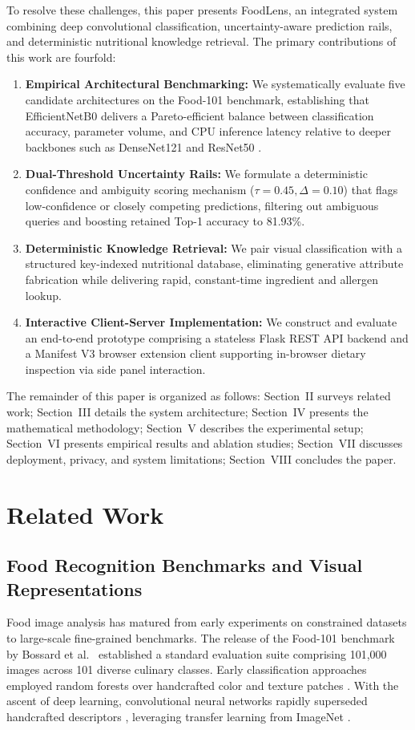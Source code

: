 \documentclass[conference]{IEEEtran}
\begin{document}
To resolve these challenges, this paper presents FoodLens, an integrated system combining deep convolutional classification, uncertainty-aware prediction rails, and deterministic nutritional knowledge retrieval. The primary contributions of this work are fourfold:
\begin{enumerate}
    \item \textbf{Empirical Architectural Benchmarking:} We systematically evaluate five candidate architectures on the Food-101 benchmark, establishing that EfficientNetB0 \cite{tan2019efficientnet} delivers a Pareto-efficient balance between classification accuracy, parameter volume, and CPU inference latency relative to deeper backbones such as DenseNet121 \cite{huang2017densely} and ResNet50 \cite{he2016deep}.
    \item \textbf{Dual-Threshold Uncertainty Rails:} We formulate a deterministic confidence and ambiguity scoring mechanism ($\tau = 0.45, \Delta = 0.10$) that flags low-confidence or closely competing predictions, filtering out ambiguous queries and boosting retained Top-1 accuracy to 81.93\%.
    \item \textbf{Deterministic Knowledge Retrieval:} We pair visual classification with a structured key-indexed nutritional database, eliminating generative attribute fabrication while delivering rapid, constant-time ingredient and allergen lookup.
    \item \textbf{Interactive Client-Server Implementation:} We construct and evaluate an end-to-end prototype comprising a stateless Flask REST API backend and a Manifest V3 browser extension client supporting in-browser dietary inspection via side panel interaction.
\end{enumerate}

The remainder of this paper is organized as follows: Section~II surveys related work; Section~III details the system architecture; Section~IV presents the mathematical methodology; Section~V describes the experimental setup; Section~VI presents empirical results and ablation studies; Section~VII discusses deployment, privacy, and system limitations; Section~VIII concludes the paper.

\section{Related Work}
\subsection{Food Recognition Benchmarks and Visual Representations}
Food image analysis has matured from early experiments on constrained datasets to large-scale fine-grained benchmarks. The release of the Food-101 benchmark by Bossard et al.~\cite{food101} established a standard evaluation suite comprising 101,000 images across 101 diverse culinary classes. Early classification approaches employed random forests over handcrafted color and texture patches \cite{food101}. With the ascent of deep learning, convolutional neural networks rapidly superseded handcrafted descriptors \cite{lowe2004distinctive,dalal2005histograms}, leveraging transfer learning from ImageNet \cite{deng2009imagenet}.
\end{document}
